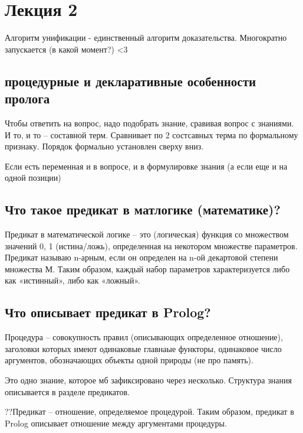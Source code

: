 \documentclass[12pt]{report}
\begin{document}
\chapter*{Лекция 2}

Алгоритм унификации - единственный алгоритм доказательства. Многократно запускается (в какой момент?)
<3





\section*{процедурные и декларативные особенности пролога}

Чтобы ответить на вопрос, надо подобрать знание, сравивая вопрос с знаниями.  И то, и то -- составной терм. Сравнивает по 2 состсавных терма по формальному признаку. Порядок формально установлен  сверху вниз.

Если есть переменная и в вопросе, и в формулировке знания (а если еще и на одной позиции)





\section{Что такое предикат в матлогике (математике)?}

Предикат в математической логике -- это (логическая) функция со множеством значений {0, 1} (истина/ложь), определенная на некотором множестве параметров. Предикат называю n-арным, если он определен на n-ой декартовой степени множества М. Таким образом, каждый набор параметров характеризуется либо как «истинный», либо как «ложный».


\section{Что описывает предикат в Prolog?}

Процедура -- совокупность правил (описывающих определенное отношение), заголовки которых имеют одинаковые главнаые функторы, одинаковое число аргументов, обозначающих объекты одной природы (не про память). 

Это одно знание, которое мб зафиксировано через несколько. Структура знания описывается в разделе предикатов. 

??Предикат -- отношение, определяемое процедурой. Таким образом, предикат в Prolog описывает отношение между аргументами процедуры. 
\end{document}
